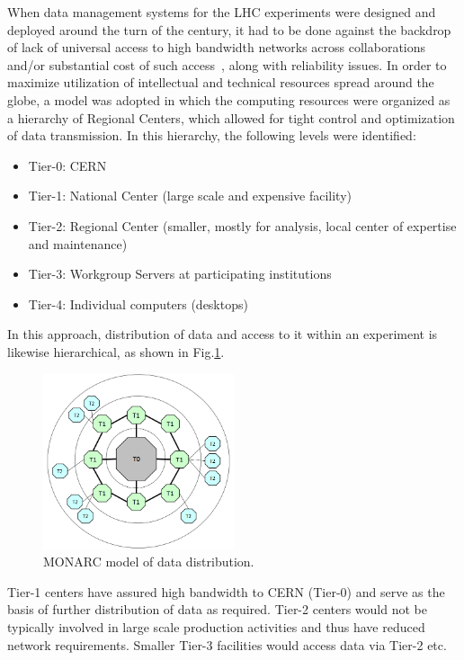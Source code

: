 When data management systems for the LHC experiments were designed and deployed around the turn of the century, it had to be done
against the backdrop of lack of universal access to high bandwidth networks across collaborations and/or substantial cost of such access~\cite{monarc},
along with reliability issues.
In order to maximize utilization of intellectual and technical resources spread around the globe, a model was adopted in which the computing resources
were organized as a hierarchy of Regional Centers, which allowed for tight control and optimization of data transmission. In this hierarchy, the following
levels were identified:
\begin{itemize}
\item Tier-0: CERN
\item Tier-1: National Center (large scale and expensive facility)
\item Tier-2: Regional Center (smaller, mostly for analysis, local center of expertise and maintenance)
\item Tier-3: Workgroup Servers at participating institutions
\item Tier-4: Individual computers (desktops)
\end{itemize}
\noindent
In this approach, distribution of data and access to it within an experiment is likewise hierarchical, as shown in Fig.\ref{fig:monarc}.
\begin{figure}[h!]
\centering
\includegraphics[width=0.5\textwidth]{monarc-model.png}
\caption{MONARC model of data distribution.}
\label{fig:monarc}
\end{figure}
Tier-1 centers have assured high bandwidth to CERN (Tier-0) and serve as the basis of further distribution of data
as required. Tier-2 centers would not be typically involved in large scale production activities and thus have reduced
network requirements. Smaller Tier-3 facilities would access data via Tier-2 etc.


